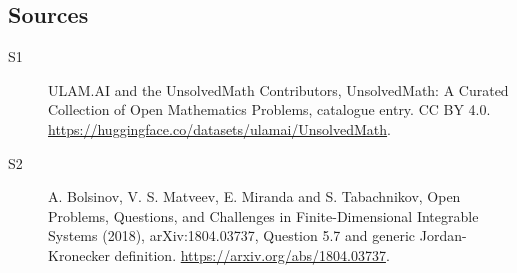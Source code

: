 \documentclass[11pt]{article}
\begin{document}
\subsection{Sources}
\begin{description}
\item[\hypertarget{source:statement:1}{S1}] ULAM.AI and the UnsolvedMath Contributors, UnsolvedMath: A Curated Collection of Open Mathematics Problems, catalogue entry. CC BY 4.0. \url{https://huggingface.co/datasets/ulamai/UnsolvedMath}.
\item[\hypertarget{source:statement:2}{S2}] A. Bolsinov, V. S. Matveev, E. Miranda and S. Tabachnikov, Open Problems, Questions, and Challenges in Finite-Dimensional Integrable Systems (2018), arXiv:1804.03737, Question 5.7 and generic Jordan-Kronecker definition. \url{https://arxiv.org/abs/1804.03737}.
\end{description}
\label{end:statement}
\end{document}
